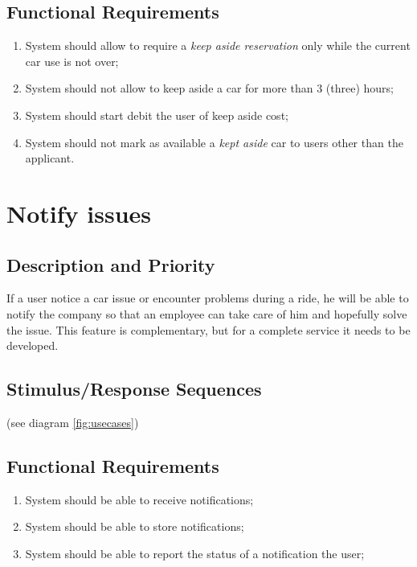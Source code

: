 \documentclass{scrreprt}
\begin{document}
\subsection{Functional Requirements}
\begin{enumerate}[label=R\arabic*.,resume]
\item System should allow to require a \emph{keep aside reservation} only while the current car use is not over;
\item System should not allow to keep aside a car for more than 3 (three) hours;
\item System should start debit the user of keep aside cost;
\item System should not mark as available a \emph{kept aside} car to users other than the applicant.
\end{enumerate}

\section{Notify issues}
\subsection{Description and Priority}
If a user notice a car issue or encounter problems during a ride, he will be able to notify the company so that an employee can take care of him and hopefully solve the issue.
This feature is complementary, but for a complete service it needs to be developed.
\subsection{Stimulus/Response Sequences}
(see diagram \vref{fig:usecases})
\subsection{Functional Requirements}
\begin{enumerate}[label=R\arabic*.,resume]
\item System should be able to receive notifications;
\item System should be able to store notifications;
\item System should be able to report the status of a notification the user;
\end{enumerate}
\end{document}
